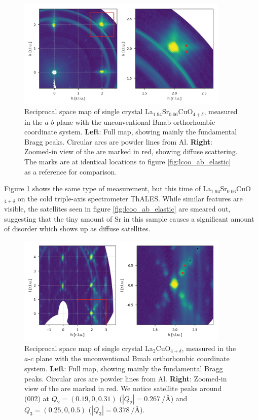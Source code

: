 \begin{figure}
    \centering
    \includegraphics[width=0.9\textwidth]{fig/pdf/lscoo_ab_elastic.png}
    \caption{Reciprocal space map of single crystal La$_{1.94}$Sr$_{0.06}$CuO$_{4+\delta}$, measured in the $a$-$b$ plane with the unconventional Bmab orthorhombic coordinate system. \textbf{Left}: Full map, showing mainly the fundamental Bragg peaks. Circular arcs are powder lines from Al. \textbf{Right}: Zoomed-in view of the are marked in red, showing diffuse scattering. The marks are at identical locations to figure \ref{fig:lcoo_ab_elastic} as a reference for comparison.}
    \label{fig:lscoo_ab_elastic}
\end{figure}

Figure \ref{fig:lscoo_ab_elastic} shows the same type of measurement, but this time of La$_{1.94}$Sr$_{0.06}$CuO$_{4+\delta}$ on the cold triple-axis spectrometer ThALES. While similar features are visible, the satellites seen in figure \ref{fig:lcoo_ab_elastic} are smeared out, suggesting that the tiny amount of Sr in this sample causes a significant amount of disorder which shows up as diffuse satellites.

\begin{figure}
    \centering
    \includegraphics[width=0.9\textwidth]{fig/pdf/lscoo_ac_elastic.png}
    \caption{Reciprocal space map of single crystal La$_2$CuO$_{4+\delta}$, measured in the $a$-$c$ plane with the unconventional Bmab orthorhombic coordinate system. \textbf{Left}: Full map, showing mainly the fundamental Bragg peaks. Circular arcs are powder lines from Al. \textbf{Right}: Zoomed-in view of the are marked in red. We notice satellite peaks around (002) at $Q_2=(0.19,0,0.31)$ ($|Q_2| = \SI{0.267}{\per\angstrom}$) and $Q_3=(0.25,0,0.5)$ ($|Q_3| = \SI{0.378}{\per\angstrom}$).}
    \label{fig:lscoo_ac_elastic}
\end{figure}

